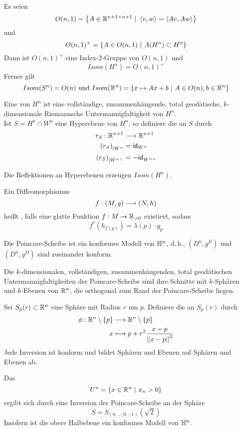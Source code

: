 \documentclass{book}
\begin{document}
\Lem{}
Es seien
\[ O(n,1) = \set{A \in \R^{n+1\times n + 1}}{ \shrp{v,w} = \shrp{Av, Aw} }\]
und
\[ O(n,1)^+ = \set{A \in O(n,1)}{A (H^n) \subset H^n } \]
Dann ist $O(n,1)^+$ eine Index-2-Gruppe von $O(n,1)$ und
\[ Isom(H^n) = O(n,1)^+ \]
Ferner gilt
\[ Isom(S^n) = O(n) \text{ und } Isom(\R^n) = \set{x\mapsto Ax + b}{A \in O(n), b\in \R^n } \]

\Def{}
Eine  von $H^n$ ist eine vollständige, zusammenhängende, total geodätische, $k$-dimensionale Riemannsche Untermannigfaltigkeit von $H^n$.\\
Ist $S = H^n\cap W^n$ eine Hyperebene von $H^n$, so definiere die  an $S$ durch
\begin{align*}
r_S : \mathbb{R}^{n+1} & \overset{}{\longrightarrow} \mathbb{R}^{n+1}\\
\left(r_S\right)_{|W^n} &= \textsf{id}_{W^n}\\
\left(r_S\right)_{|{W^n}^\bot} &= -\textsf{id}_{{W^n}^\bot}
\end{align*}

\Prop{}
Die Reflektionen an Hyperebenen erzeugen $Isom(H^n)$.

\Def{}
Ein Diffeomorphismus
\[ f : (M,g) \overset{}{\longrightarrow} (N,h) \] 
heißt , falls eine glatte Funktion $f : M \overset{}{\rightarrow} \mathbb{R}_{>0}$ existiert, sodass
\[ f^*(h_{f(p)}) = \lambda(p)\cdot g_p  \]

\Bem{}
Die Poincare-Scheibe ist ein konformes Modell von $\mathbb{H}^n$, d.\,h., $(D^n, g^E)$ und $(D^n, g^D)$ sind zueinander konform.

\Lem{}
Die $k$-dimensionalen, vollständigen, zusammenhängenden, total geodätischen Untermannigfaltigkeiten der Poincare-Scheibe sind ihre Schnitte mit $k$-Sphären und $k$-Ebenen von $\mathbb{R}^n$, die orthogonal zum Rand der Poincare-Scheibe liegen.

\Def{}
Sei $S_{p}(r) \subset \mathbb{R}^n$ eine Sphäre mit Radius $r$ um $p$. Definiere die  an $S_p(r)$ durch
\begin{align*}
\phi : \mathbb{R}^n\setminus\{p\} & \overset{}{\longrightarrow} \mathbb{R}^n\setminus\{p\}\\
x & \longmapsto p + r^2\frac{x- p}{\left|\left|x-p\right|\right|^2}
\end{align*}
\Prop{}
Jede Inversion ist konform und bildet Sphären und Ebenen auf Sphären und Ebenen ab.

\Def{}
Das 
\[ U^n = \set{x \in \R^{n}}{x_n > 0} \]
ergibt sich durch eine Inversion der Poincare-Scheibe an der Sphäre
\[ S = S_{(0,\ldots,0,-1)}(\sqrt{2}) \]
Insofern ist die obere Halbebene ein konformes Modell von $\mathbb{H}^n$.
\end{document}
